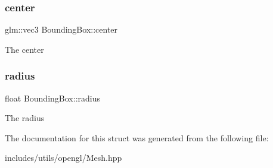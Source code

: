 \subsubsection{\texorpdfstring{center}{center}}
{\footnotesize\ttfamily glm\+::vec3 Bounding\+Box\+::center}

The center \mbox{\label{struct_bounding_box_ab85c564601bd9907b4e1cd88b9e11aa2}} 
\subsubsection{\texorpdfstring{radius}{radius}}
{\footnotesize\ttfamily float Bounding\+Box\+::radius}

The radius 

The documentation for this struct was generated from the following file\+:\begin{DoxyCompactItemize}
\item 
includes/utils/opengl/Mesh.\+hpp\end{DoxyCompactItemize}
